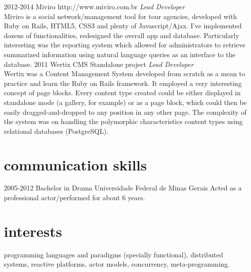\documentclass[]{friggeri-cv} %
\begin{document}
\begin{entrylist}
\entry
{2012-2014}
{Miviro}
{http://www.miviro.com.br}
{\emph{Lead Developer} \\
Miviro is a social network/management tool for tour agencies, developed with 
Ruby on Rails, HTML5, CSS3 and plenty of Javascript/Ajax. I've implemented 
dozens of functionalities, redesigned the overall app and database. 
Particularly interesting was the reporting system which allowed for 
administrators to retrieve summarized information using natural 
language queries as an interface to the database.
}
\entry
{2011}
{Wertix CMS}
{Standalone project}
{\emph{Lead Developer} \\
Wertix was a Content Management System developed from scratch as a mean to 
practice and learn the Ruby on Rails framework. It employed a very interesting 
concept of page blocks. Every content type created could be either displayed in 
standalone mode (a gallery, for example) or as a page block, which could then be
easily dragged-and-dropped to any position in any other page. 
The complexity of the system was on handling the polymorphic characteristics 
content types using relational databases (PostgreSQL).
}
\end{entrylist}


\section{communication skills}

\begin{entrylist}
\entry
{2005-2012}
{Bachelor in Drama}
{Universidade Federal de Minas Gerais}
{Acted as a professional actor/performed for about 6 years.}
\end{entrylist}


\section{interests}
programming languages and paradigms (specially functional),
distributed systems, reactive platforms, actor models, concurrency, 
meta-programming. 
\end{document}
